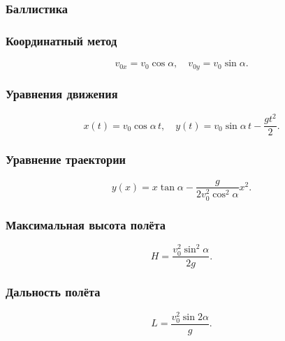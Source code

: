 \documentclass[12pt, a4paper]{article}
\begin{document}
\subsubsection*{Баллистика}

\subsubsection*{Координатный метод}
\[
v_{0x} = v_0\cos\alpha, \quad v_{0y} = v_0\sin\alpha.
\]

\subsubsection*{Уравнения движения}
\[
x(t) = v_0\cos\alpha\,t, \quad y(t) = v_0\sin\alpha\,t - \frac{gt^2}{2}.
\]

\subsubsection*{Уравнение траектории}
\[
y(x) = x\tan\alpha - \frac{g}{2v_0^2\cos^2\alpha} x^2.
\]

\subsubsection*{Максимальная высота полёта}
\[
H = \frac{v_0^2\sin^2\alpha}{2g}.
\]

\subsubsection*{Дальность полёта}
\[
L = \frac{v_0^2\sin 2\alpha}{g}.
\]
\end{document}
